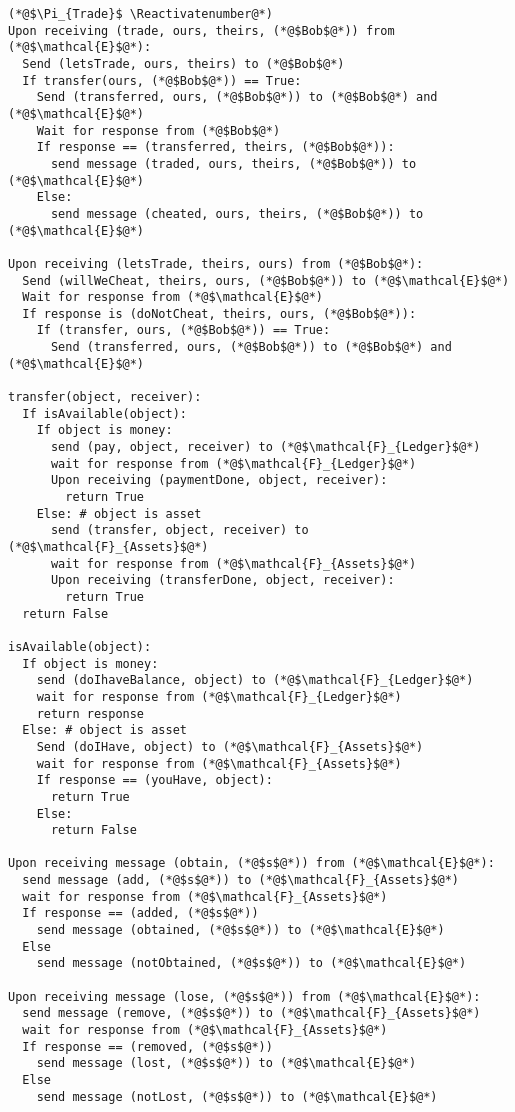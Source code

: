\Suppressnumber
\begin{lstlisting}[label=tradeprot, style=numbers]
(*@$\Pi_{Trade}$ \Reactivatenumber@*)
Upon receiving (trade, ours, theirs, (*@$Bob$@*)) from (*@$\mathcal{E}$@*):
  Send (letsTrade, ours, theirs) to (*@$Bob$@*)
  If transfer(ours, (*@$Bob$@*)) == True:
    Send (transferred, ours, (*@$Bob$@*)) to (*@$Bob$@*) and (*@$\mathcal{E}$@*)
    Wait for response from (*@$Bob$@*)
    If response == (transferred, theirs, (*@$Bob$@*)):
      send message (traded, ours, theirs, (*@$Bob$@*)) to (*@$\mathcal{E}$@*)
    Else:
      send message (cheated, ours, theirs, (*@$Bob$@*)) to (*@$\mathcal{E}$@*)

Upon receiving (letsTrade, theirs, ours) from (*@$Bob$@*):
  Send (willWeCheat, theirs, ours, (*@$Bob$@*)) to (*@$\mathcal{E}$@*)
  Wait for response from (*@$\mathcal{E}$@*)
  If response is (doNotCheat, theirs, ours, (*@$Bob$@*)):
    If (transfer, ours, (*@$Bob$@*)) == True:
      Send (transferred, ours, (*@$Bob$@*)) to (*@$Bob$@*) and (*@$\mathcal{E}$@*)

transfer(object, receiver):
  If isAvailable(object):
    If object is money:
      send (pay, object, receiver) to (*@$\mathcal{F}_{Ledger}$@*)
      wait for response from (*@$\mathcal{F}_{Ledger}$@*)
      Upon receiving (paymentDone, object, receiver):
        return True
    Else: # object is asset
      send (transfer, object, receiver) to (*@$\mathcal{F}_{Assets}$@*)
      wait for response from (*@$\mathcal{F}_{Assets}$@*)
      Upon receiving (transferDone, object, receiver):
        return True
  return False

isAvailable(object):
  If object is money:
    send (doIhaveBalance, object) to (*@$\mathcal{F}_{Ledger}$@*)
    wait for response from (*@$\mathcal{F}_{Ledger}$@*)
    return response
  Else: # object is asset
    Send (doIHave, object) to (*@$\mathcal{F}_{Assets}$@*)
    wait for response from (*@$\mathcal{F}_{Assets}$@*)
    If response == (youHave, object):
      return True
    Else:
      return False

Upon receiving message (obtain, (*@$s$@*)) from (*@$\mathcal{E}$@*):
  send message (add, (*@$s$@*)) to (*@$\mathcal{F}_{Assets}$@*)
  wait for response from (*@$\mathcal{F}_{Assets}$@*)
  If response == (added, (*@$s$@*))
    send message (obtained, (*@$s$@*)) to (*@$\mathcal{E}$@*)
  Else
    send message (notObtained, (*@$s$@*)) to (*@$\mathcal{E}$@*)

Upon receiving message (lose, (*@$s$@*)) from (*@$\mathcal{E}$@*):
  send message (remove, (*@$s$@*)) to (*@$\mathcal{F}_{Assets}$@*)
  wait for response from (*@$\mathcal{F}_{Assets}$@*)
  If response == (removed, (*@$s$@*))
    send message (lost, (*@$s$@*)) to (*@$\mathcal{E}$@*)
  Else
    send message (notLost, (*@$s$@*)) to (*@$\mathcal{E}$@*)
\end{lstlisting}
